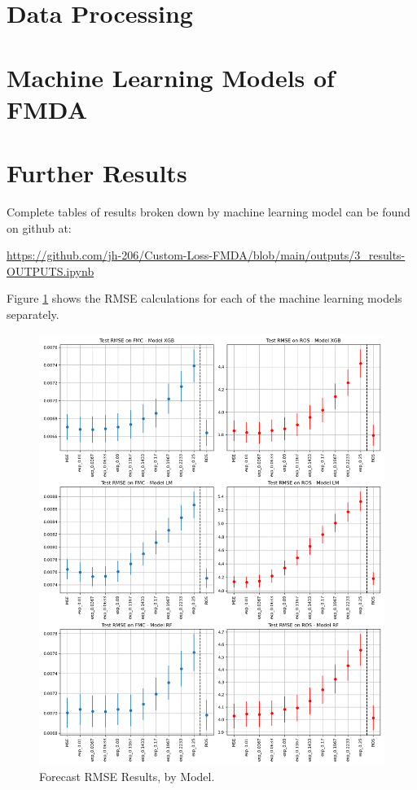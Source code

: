 \documentclass[11pt]{article}%
\begin{document}
\appendix
{}
\section{Data Processing} 
\label{app:data}

\section{Machine Learning Models of FMDA} 
\label{app:ml}


\section{Further Results}
\label{app:res}

Complete tables of results broken down by machine learning model can be found on github at: 

\url{https://github.com/jh-206/Custom-Loss-FMDA/blob/main/outputs/3_results-OUTPUTS.ipynb}

Figure \ref{fig:results2} shows the RMSE calculations for each of the machine learning models separately.

\begin{figure}[ht]
    \centering
    \includegraphics[width=1\textwidth]{images/results2.png}
    \caption{Forecast RMSE Results, by Model.}
    \label{fig:results2}
\end{figure}
\end{document}
